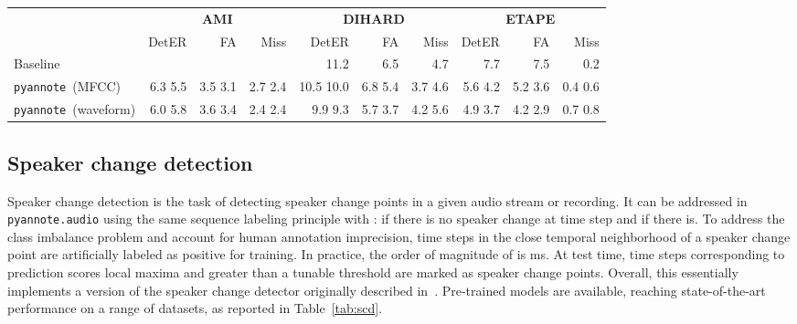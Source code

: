 \documentclass{article}
\def\pyannote{{\small\texttt{pyannote}}}
\begin{document}
\begin{table*}[htb]
    \centering
    \begin{tabular}{|l|r|rr|r|rr|r|rr|}
        \hline
            & \multicolumn{3}{c|}{\textbf{AMI}} & \multicolumn{3}{c|}{\textbf{DIHARD}} & \multicolumn{3}{c|}{\textbf{ETAPE}}\\
            & DetER & FA & Miss & DetER & FA & Miss & DetER & FA & Miss \\
        \hline
        Baseline & & & & 11.2 \cite{Diez2019, dihard} &  6.5 & 4.7 &  7.7 \cite{S4D} & 7.5 & 0.2 \\
        \hline
        \pyannote~(MFCC)~\cite{Gelly2018} & 6.3 \scriptsize{5.5} & 3.5 \scriptsize{3.1} & 2.7 \scriptsize{2.4} & 10.5 \scriptsize{10.0} & 6.8 \scriptsize{5.4} & 3.7 \scriptsize{4.6} & 5.6 \scriptsize{4.2} & 5.2 \scriptsize{3.6} & 0.4 \scriptsize{0.6} \\
        \pyannote~(waveform) & 6.0 \scriptsize{5.8} & 3.6 \scriptsize{3.4} & 2.4 \scriptsize{2.4} & 9.9 \scriptsize{9.3} & 5.7 \scriptsize{3.7} & 4.2 \scriptsize{5.6} & 4.9 \scriptsize{3.7} & 4.2 \scriptsize{2.9} & 0.7 \scriptsize{0.8}\\
        \hline

    \end{tabular}
    \caption{Evaluation of pre-trained voice activity detection models, in terms of detection error (DetER \%), false alarm (FA \%), and missed detection (Miss \%) rates. Results on the development set are reported using small font size.  We report two {\small{\texttt{pyannote.audio}}} variants: the first one is based on handcrafted features (MFCCs) and the other one is an end-to-end model processing the waveform directly.
\emph{Baseline} corresponds to the best result we could find in the literature as of October 2019.}
    \label{tab:vad}
\end{table*}

\vspace{-0.17cm}
\subsection{Speaker change detection}

Speaker change detection is the task of detecting speaker change points in a given audio stream or recording. It can be addressed in {\small\texttt{pyannote.audio}} using the same sequence labeling principle with :  if there is no speaker change at time step  and  if there is. To address the class imbalance problem and account for human annotation imprecision, time steps  in the close temporal neighborhood of a speaker change point  are artificially labeled as positive for training. In practice, the order of magnitude of  is ms. At test time, time steps corresponding to prediction scores local maxima and greater than a tunable threshold  are marked as speaker change points. Overall, this essentially implements a version of the speaker change detector originally described in~\cite{Yin2017}. Pre-trained models are available, reaching state-of-the-art performance on a range of datasets, as reported in Table~\ref{tab:scd}.
\end{document}
